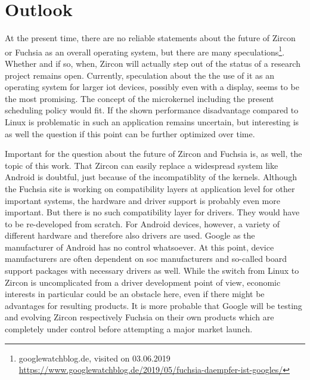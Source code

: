 
\chapter{Outlook}\label{ch:outlook}
%

At the present time, there are no reliable statements about the future of Zircon or Fuchsia as an overall operating system, but there are many speculations\footnote{googlewatchblog.de, visited on 03.06.2019 \url{https://www.googlewatchblog.de/2019/05/fuchsia-daempfer-ist-googles/}}.
Whether and if so, when, Zircon will actually step out of the status of a research project remains open.
Currently, speculation about the the use of it as an operating system for larger \ac{iot} devices, possibly even with a display, seems to be the most promising.
The concept of the microkernel including the present scheduling policy would fit.
If the shown performance disadvantage compared to Linux is problematic in such an application remains uncertain, but interesting is as well the question if this point can be further optimized over time.

Important for the question about the future of Zircon and Fuchsia is, as well, the topic of this work.
That Zircon can easily replace a widespread system like Android is doubtful, just because of the incompatiblity of the kernels.
Although the Fuchsia site is working on compatibility layers at application level for other important systems, the hardware and driver support is probably even more important.
But there is no such compatibility layer for drivers.
They would have to be re-developed from scratch.
For Android devices, however, a variety of different hardware and therefore also drivers are used.
Google as the manufacturer of Android has no control whatsoever.
At this point, device manufacturers are often dependent on \ac{soc} manufacturers and so-called board support packages with necessary drivers as well.
While the switch from Linux to Zircon is uncomplicated from a driver development point of view, economic interests in particular could be an obstacle here, even if there might be advantages for resulting products.
It is more probable that Google will be testing and evolving Zircon respectively Fuchsia on their own products which are completely under control before attempting a major market launch.

